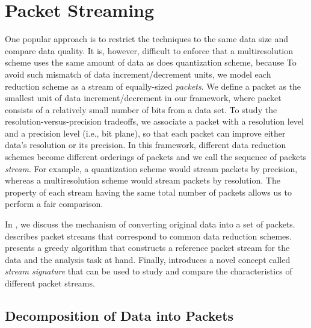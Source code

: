 \section{Packet Streaming} \label{sec:terminologies}

One popular approach is to restrict the techniques to the same data size and
compare data quality. It is, however, difficult to enforce that a
multiresolution scheme uses the same amount of data as does quantization scheme,
because   To avoid such mismatch of data increment/decrement units, we model
each reduction scheme as a stream of equally-sized \emph{packets}.  We define a
packet as the smallest unit of data increment/decrement in our framework, where 
packet consists of a relatively small number of bits from a data set. To
study the resolution-versus-precision tradeoffs, we associate a packet with a
resolution level and a precision level (i.e., bit plane), so that each packet
can improve either data's resolution or its precision. In this framework,
different data reduction schemes become different orderings of packets and
we call the sequence of packets \emph{stream}.  For example, a quantization
scheme would stream packets by precision, whereas a multiresolution scheme would
stream packets by resolution. The property of each stream having the same total
number of packets allows us to perform a fair comparison.

In , we discuss the mechanism of converting
original data into a set of packets. 
describes packet streams that correspond to common data reduction schemes.
 presents a greedy algorithm that constructs a reference
packet stream for the data and the analysis task at hand. Finally,
 introduces a novel concept called \emph{stream
signature} that can be used to study and compare the characteristics of
different packet streams.

\subsection{Decomposition of Data into Packets} \label{sec:data-streaming-framework}

